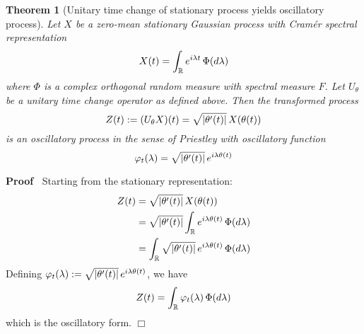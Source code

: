 \documentclass{article}
\newcommand{\assign}{:=}
\newenvironment{proof}{\noindent\textbf{Proof\ }}{\hspace*{\fill}$\Box$\medskip}
\newtheorem{theorem}{Theorem}
\begin{document}
\begin{theorem}
  [Unitary time change of stationary process yields oscillatory process] Let $X$ be a zero-mean stationary Gaussian process with Cramér spectral representation
  \begin{equation}
    X(t) = \int_{\mathbb{R}} e^{i \lambda t} \hspace{0.17em} \Phi(d\lambda)
  \end{equation}
  where $\Phi$ is a complex orthogonal random measure with spectral measure $F$. Let $U_{\theta}$ be a unitary time change operator as defined above. Then the transformed process
  \begin{equation}
    Z(t) \assign (U_{\theta} X)(t) = \sqrt{|\theta'(t)|} \hspace{0.17em} X(\theta(t))
  \end{equation}
  is an oscillatory process in the sense of Priestley with oscillatory function
  \begin{equation}
    \varphi_t(\lambda) = \sqrt{|\theta'(t)|} \hspace{0.17em} e^{i \lambda \theta(t)}
  \end{equation}
\end{theorem}

\begin{proof}
  Starting from the stationary representation:
  \begin{align}
    Z(t) &= \sqrt{|\theta'(t)|} \hspace{0.17em} X(\theta(t)) \\
    &= \sqrt{|\theta'(t)|} \int_{\mathbb{R}} e^{i \lambda \theta(t)} \hspace{0.17em} \Phi(d\lambda) \\
    &= \int_{\mathbb{R}} \sqrt{|\theta'(t)|} \hspace{0.17em} e^{i \lambda \theta(t)} \hspace{0.17em} \Phi(d\lambda)
  \end{align}
  Defining $\varphi_t(\lambda) \assign \sqrt{|\theta'(t)|} \hspace{0.17em} e^{i \lambda \theta(t)}$, we have
  \begin{equation}
    Z(t) = \int_{\mathbb{R}} \varphi_t(\lambda) \hspace{0.17em} \Phi(d\lambda)
  \end{equation}
  which is the oscillatory form.
\end{proof}
\end{document}
